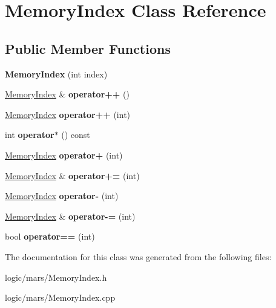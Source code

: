 \hypertarget{classMemoryIndex}{}\section{Memory\+Index Class Reference}
\label{classMemoryIndex}
\subsection*{Public Member Functions}
\begin{DoxyCompactItemize}
\item 
\mbox{\label{classMemoryIndex_a8ba4d0ed483633f22f394afc75bbd363}} 
{\bfseries Memory\+Index} (int index)
\item 
\mbox{\label{classMemoryIndex_a099a6efe3d15752206db4e0a6cfde758}} 
\hyperlink{classMemoryIndex}{Memory\+Index} \& {\bfseries operator++} ()
\item 
\mbox{\label{classMemoryIndex_a1bfedace329ab61eea1e18c2dd6971a3}} 
\hyperlink{classMemoryIndex}{Memory\+Index} {\bfseries operator++} (int)
\item 
\mbox{\label{classMemoryIndex_ad090f29c22ac178bbca8a00f57b6873e}} 
int {\bfseries operator$\ast$} () const
\item 
\mbox{\label{classMemoryIndex_ad9c7e20d9d1c5ed1a19cc3334d8a5872}} 
\hyperlink{classMemoryIndex}{Memory\+Index} {\bfseries operator+} (int)
\item 
\mbox{\label{classMemoryIndex_a15bac8ea73954ee665e05c3f018d291f}} 
\hyperlink{classMemoryIndex}{Memory\+Index} \& {\bfseries operator+=} (int)
\item 
\mbox{\label{classMemoryIndex_a5f9fe18cb9d41d5625fa1f4191bd9794}} 
\hyperlink{classMemoryIndex}{Memory\+Index} {\bfseries operator-\/} (int)
\item 
\mbox{\label{classMemoryIndex_af5854bfbf3b1fc93b68291426de1dd14}} 
\hyperlink{classMemoryIndex}{Memory\+Index} \& {\bfseries operator-\/=} (int)
\item 
\mbox{\label{classMemoryIndex_af8cebaa913daaad29d4cbf1683456392}} 
bool {\bfseries operator==} (int)
\end{DoxyCompactItemize}


The documentation for this class was generated from the following files\+:\begin{DoxyCompactItemize}
\item 
logic/mars/Memory\+Index.\+h\item 
logic/mars/Memory\+Index.\+cpp\end{DoxyCompactItemize}
